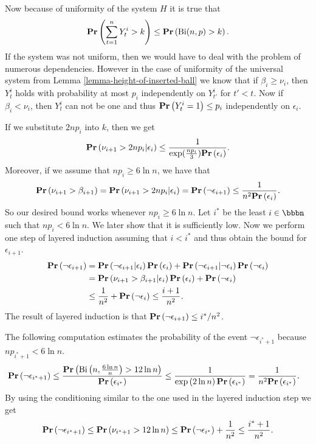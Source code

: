 Now because of uniformity of the system $H$ it is true that $$\mathbf{Pr}\left(\sum_{t = 1}^{n} Y_t^i > k\right) \leq \mathbf{Pr}\left(\mathrm{Bi}(n, p) > k\right).$$ If the system was not uniform, then we would have to deal with the problem of numerous dependencies. However in the case of uniformity of the universal system from Lemma \ref{lemma-height-of-inserted-ball} we know that if $\beta_i \geq \nu_i$, then $Y_t^i$ holds with probability at most $p_i$ independently on $Y_{t'}^i$ for $t' < t$. Now if $\beta_i < \nu_i$, then $Y_t^i$ can not be one and thus $\mathbf{Pr}\left(Y_t^i = 1\right) \leq p_i$ independently on $\epsilon_i$.

If we substitute $2np_i$ into $k$, then we get
\[
\mathbf{Pr}\left(\nu_{i + 1} > 2np_i | \epsilon_i\right) \leq \frac{1}{\exp(\frac{np_i}{3})\mathbf{Pr}\left(\epsilon_i\right)}.
\]
Moreover, if we assume that $np_i \geq 6 \ln n$, we have that 
\[
\mathbf{Pr}\left(\nu_{i + 1} > \beta_{i + 1}\right) = \mathbf{Pr}\left(\nu_{i + 1} > 2np_i | \epsilon_i\right) = \mathbf{Pr}\left(\neg \epsilon_{i + 1}\right) \leq \frac{1}{n ^ 2\mathbf{Pr}\left(\epsilon_i\right)} \textit{.}
\]
So our desired bound works whenever $np_i \geq 6 \ln n$. Let $i^*$ be the least $i \in \bbbn$ such that $np_i < 6 \ln n$. We later show that it is sufficiently low. Now we perform one step of layered induction assuming that $i<i^*$ and thus obtain the bound for $\epsilon_{i + 1}$.
\[
\begin{split}
\mathbf{Pr}\left(\neg \epsilon_{i + 1}\right) 
	& = \mathbf{Pr}\left(\neg \epsilon_{i + 1} | \epsilon_i\right)\mathbf{Pr}\left(\epsilon_i\right) + \mathbf{Pr}\left(\neg \epsilon_{i + 1} | \neg \epsilon_i\right)\mathbf{Pr}\left(\neg \epsilon_i\right) \\
	& = \mathbf{Pr}\left(\nu_{i + 1} > \beta_{i + 1} | \epsilon_i\right)\mathbf{Pr}\left(\epsilon_i\right) + \mathbf{Pr}\left(\neg \epsilon_i\right) \\
	& \leq \frac{1}{n ^ 2} + \mathbf{Pr}\left(\neg \epsilon_i\right) \leq \frac{i + 1}{n ^ 2} \textit{.}
\end{split} 
\]
The result of layered induction is that $\mathbf{Pr}\left(\neg \epsilon_{i + 1}\right) \leq i^* / n^2$. 

The following computation estimates the probability of the event $\neg \epsilon_{i^* + 1}$ because $np_{i^* + 1} < 6 \ln n$.
\[
\begin{split}
\mathbf{Pr}\left(\neg \epsilon_{i^* + 1}\right)
	\leq \frac{\mathbf{Pr}\left(\mathrm{Bi}\left(n, \frac{6 \ln n}{n}\right) > 12 \ln n\right)}{\mathbf{Pr}\left(\epsilon_{i^*}\right)} 
	& \leq \frac{1}{\exp\left(2 \ln n\right)\mathbf{Pr}\left(\epsilon_{i^*}\right)} = \frac{1}{n ^ 2 \mathbf{Pr}\left(\epsilon_{i^*}\right)} \textit{.}
\end{split}
\]
By using the conditioning similar to the one used in the layered induction step we get
\[
\mathbf{Pr}\left(\neg \epsilon_{i^* + 1}\right) \leq \mathbf{Pr}\left(\nu_{i^* + 1} > 12 \ln n\right) \leq \mathbf{Pr}\left(\neg \epsilon_{i^*}\right) + \frac{1}{n ^ 2} \leq \frac{i^* + 1}{n ^ 2} \textit{.}
\]

